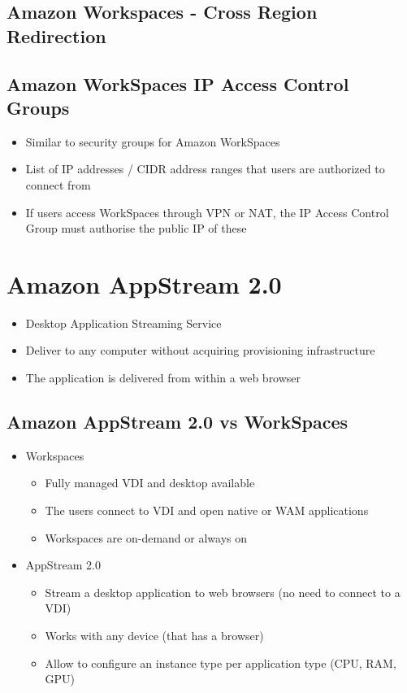 \subsection{Amazon Workspaces - Cross Region Redirection}

\subsection{Amazon WorkSpaces IP Access Control Groups}
\begin{itemize}
    \item Similar to security groups for Amazon WorkSpaces
    \item List of IP addresses / CIDR address ranges that users are authorized to connect from
    \item If users access WorkSpaces through VPN or NAT, the IP Access Control Group must authorise the public IP of these
\end{itemize}


\section{Amazon AppStream 2.0}
\begin{itemize}
    \item Desktop Application Streaming Service
    \item Deliver to any computer without acquiring provisioning infrastructure
    \item The application is delivered from within a web browser
\end{itemize}

\subsection{Amazon AppStream 2.0 vs WorkSpaces}

\begin{itemize}
    \item Workspaces
    \begin{itemize}
        \item Fully managed VDI and desktop available
        \item The users connect to VDI and open native or WAM applications
        \item Workspaces are on-demand or always on
    \end{itemize}

    \item AppStream 2.0
    \begin{itemize}
        \item Stream a desktop application to web browsers (no need to connect to a VDI)
        \item Works with any device (that has a browser)
        \item Allow to configure an instance type per application type (CPU, RAM, GPU)
    \end{itemize}
\end{itemize}


